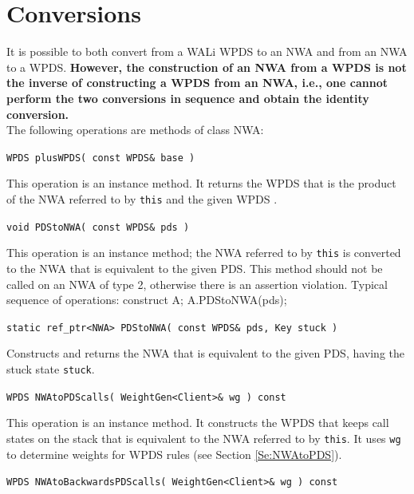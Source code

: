 \section{Conversions}
\label{Se:Conversions}


It is possible to both convert from a WALi WPDS to an NWA and from an NWA to
a WPDS.  \textbf{However, the construction of an NWA from a WPDS is not the
  inverse of constructing a WPDS from an NWA, i.e., one cannot perform the
  two conversions in sequence and obtain the identity conversion.} \\

\noindent The following operations are methods of class NWA:

\begin{description}

  \item\texttt{WPDS plusWPDS( const WPDS\& base )} \nopagebreak

    This operation is an instance method.  It returns the WPDS that is the
    product of the NWA referred to by \texttt{this} and the given WPDS
    \cite{advancedquerying}.

  \item\texttt{void PDStoNWA( const WPDS\& pds )} \nopagebreak

    This operation is an instance method; the NWA referred to by
    \texttt{this} is converted to the NWA that is equivalent to the given
    PDS.  This method should not be called on an NWA of type 2, otherwise
    there is an assertion violation.  Typical sequence of operations:
    construct A; A.PDStoNWA(pds);

  \item\texttt{static ref\_ptr<NWA> PDStoNWA( const WPDS\& pds, Key stuck )} \nopagebreak

    Constructs and returns the NWA that is equivalent to the given PDS,
    having the stuck state \texttt{stuck}.

  \item\texttt{WPDS NWAtoPDScalls( WeightGen<Client>\& wg ) const} \nopagebreak

    This operation is an instance method.  It constructs the WPDS that keeps
    call states on the stack that is equivalent to the NWA referred to by
    \texttt{this}.  It uses \texttt{wg} to determine weights for WPDS rules
    (see Section \ref{Se:NWAtoPDS}).

  \item\texttt{WPDS NWAtoBackwardsPDScalls( WeightGen<Client>\& wg ) const} \nopagebreak


\end{description}
